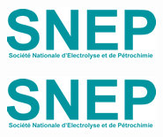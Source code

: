 \documentclass[11pt]{report}
\begin{document}
\newcommand{\HRule}{\rule{\linewidth}{0.5mm}}

\begin{minipage}{0.47\textwidth} \begin{flushleft}
		\includegraphics[scale =0.3]{images/logo_snep.png}
\end{flushleft}\end{minipage}
\begin{minipage}{0.47\textwidth} \begin{flushright}
		\includegraphics[scale = 0.3]{images/logo_snep.png}
\end{flushright}\end{minipage} 
\vspace*{-1.5cm}						
\end{document}
